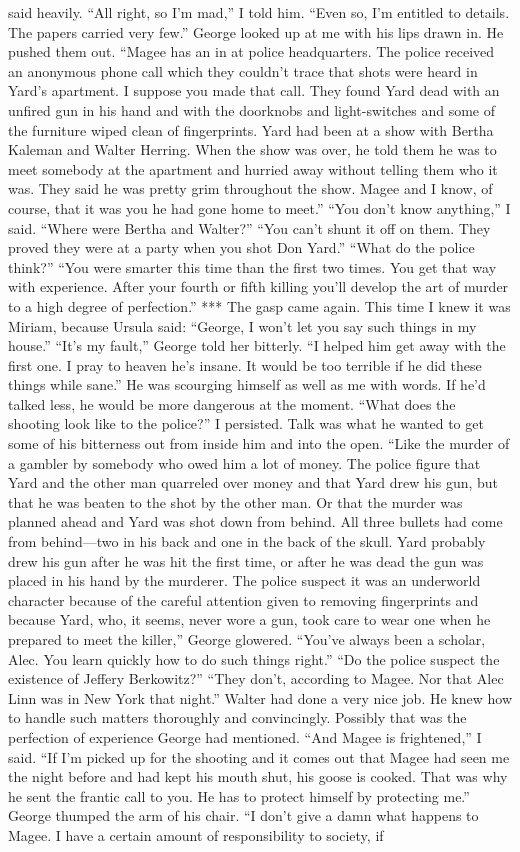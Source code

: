 \documentclass{novel}
\begin{document}
said heavily. “All right, so I’m mad,” I told him. “Even so, I’m entitled to details. The papers carried very few.” George looked up at me with his lips drawn in. He pushed them out. “Magee has an in at police headquarters. The police received an anonymous phone call which they couldn’t trace that shots were heard in Yard’s apartment. I suppose you made that call. They found Yard dead with an unfired gun in his hand and with the doorknobs and light-switches and some of the furniture wiped clean of fingerprints. Yard had been at a show with Bertha Kaleman and Walter Herring. When the show was over, he told them he was to meet somebody at the apartment and hurried away without telling them who it was. They said he was pretty grim throughout the show. Magee and I know, of course, that it was you he had gone home to meet.” “You don’t know anything,” I said. “Where were Bertha and Walter?” “You can’t shunt it off on them. They proved they were at a party when you shot Don Yard.” “What do the police think?” “You were smarter this time than the first two times. You get that way with experience. After your fourth or fifth killing you’ll develop the art of murder to a high degree of perfection.” *** The gasp came again. This time I knew it was Miriam, because Ursula said: “George, I won’t let you say such things in my house.” “It’s my fault,” George told her bitterly. “I helped him get away with the first one. I pray to heaven he’s insane. It would be too terrible if he did these things while sane.” He was scourging himself as well as me with words. If he’d talked less, he would be more dangerous at the moment. “What does the shooting look like to the police?” I persisted. Talk was what he wanted to get some of his bitterness out from inside him and into the open. “Like the murder of a gambler by somebody who owed him a lot of money. The police figure that Yard and the other man quarreled over money and that Yard drew his gun, but that he was beaten to the shot by the other man. Or that the murder was planned ahead and Yard was shot down from behind. All three bullets had come from behind—two in his back and one in the back of the skull. Yard probably drew his gun after he was hit the first time, or after he was dead the gun was placed in his hand by the murderer. The police suspect it was an underworld character because of the careful attention given to removing fingerprints and because Yard, who, it seems, never wore a gun, took care to wear one when he prepared to meet the killer,” George glowered. “You’ve always been a scholar, Alec. You learn quickly how to do such things right.” “Do the police suspect the existence of Jeffery Berkowitz?” “They don’t, according to Magee. Nor that Alec Linn was in New York that night.” Walter had done a very nice job. He knew how to handle such matters thoroughly and convincingly. Possibly that was the perfection of experience George had mentioned. “And Magee is frightened,” I said. “If I’m picked up for the shooting and it comes out that Magee had seen me the night before and had kept his mouth shut, his goose is cooked. That was why he sent the frantic call to you. He has to protect himself by protecting me.” George thumped the arm of his chair. “I don’t give a damn what happens to Magee. I have a certain amount of responsibility to society, if 
\end{document}
